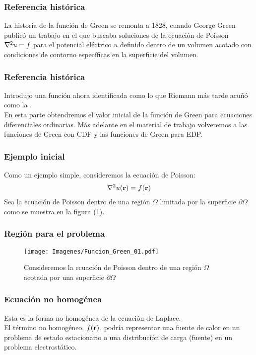 \documentclass[12pt]{beamer}
\begin{document}
\begin{frame}
\frametitle{Referencia histórica}
La historia de la función de Green se remonta a 1828, cuando George Green publicó un trabajo en el que buscaba soluciones de la ecuación de Poisson $\laplacian{u} = f$ para el potencial eléctrico $u$ definido dentro de un volumen acotado con condiciones de contorno específicas en la superficie del volumen.
\end{frame}

\begin{frame}
\frametitle{Referencia histórica}
Introdujo una función ahora identificada como lo que Riemann más tarde acuñó como la .
\\
\bigskip
\pause
En esta parte obtendremos el valor inicial de la función de Green para ecuaciones diferenciales ordinarias.  \pause Más adelante en el material de trabajo volveremos a las funciones de Green con CDF y las funciones de Green para EDP.
\end{frame}

\begin{frame}
\frametitle{Ejemplo inicial}
Como un ejemplo simple, consideremos la ecuación de Poisson:
\pause
\begin{align*}
\laplacian{u} (\vb{r}) = f (\vb{r})
\end{align*}
Sea la ecuación de Poisson dentro de una región $\Omega$ limitada por la superficie $\partial \Omega$ como se muestra en la figura (\ref{fig:figura_07_01}).
\end{frame}

\begin{frame}
\frametitle{Región para el problema}
\begin{figure}[H]
\centering
\texttt{[image: Imagenes/Funcion\_Green\_01.pdf]}
\caption{Consideremos la ecuación de Poisson dentro de una región $\Omega$ acotada por una superficie $\partial \Omega$}
\label{fig:figura_07_01}
\end{figure}
\end{frame}

\begin{frame}
\frametitle{Ecuación no homogénea}
Esta es la forma no homogénea de la ecuación de Laplace.
\\
\bigskip
\pause
El término no homogéneo, $f (\vb{r})$, podría representar una fuente de calor en un problema de estado estacionario o una distribución de carga (fuente) en un problema electrostático.
\end{frame}
\end{document}
